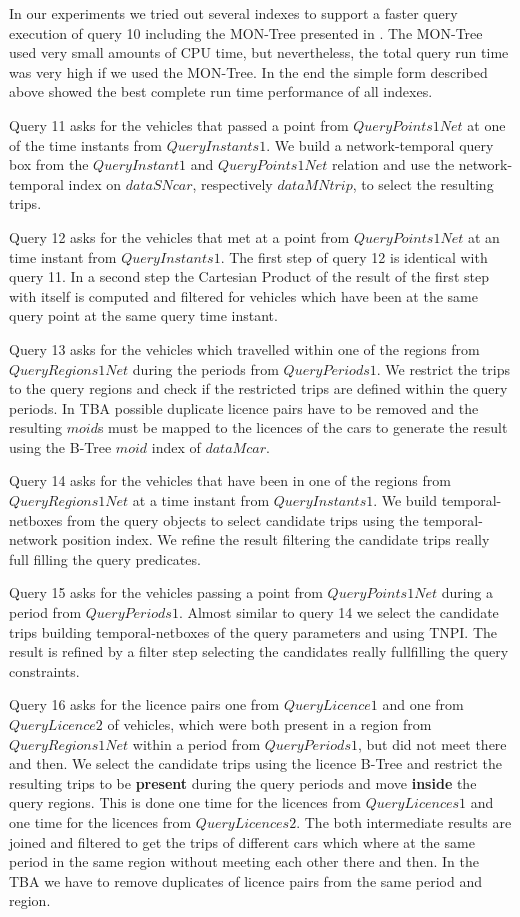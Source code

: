 \documentclass[a4paper]{article}
\newcommand{\op}[1]{\textbf{#1}}
\begin{document}
In our experiments we tried out several indexes to support a faster query execution
of query 10 including the MON-Tree presented in \cite{MONTreeAlmeidaGeoinformatica}.
The MON-Tree used very small amounts of CPU time, but nevertheless, the total query
run time was very high if we used the MON-Tree. In the end the simple form described
above showed the best complete run time performance of all indexes.

Query 11 asks for the vehicles that passed a point from $QueryPoints1Net$ at one of the
time instants from $QueryInstants1$. We build a network-temporal query box from the
$QueryInstant1$ and $QueryPoints1Net$ relation and use the network-temporal index
on $dataSNcar$, respectively $dataMNtrip$, to select the resulting trips.

Query 12 asks for the vehicles that met at a point from $QueryPoints1Net$ at an time
instant from $QueryInstants1$. The first step of query 12 is identical with query 11.
In a second step the Cartesian Product of the result of the first step with itself
is computed and filtered for vehicles which have been at the same query point
at the same query time instant.

Query 13 asks for the vehicles which travelled within one of the regions from
$QueryRegions1Net$ during the periods from $QueryPeriods1$. We restrict the trips
to the query regions and check if the restricted trips are defined within the query
periods. In TBA possible duplicate licence pairs have to be removed and the
resulting $moid$s must be mapped to the licences of the cars to generate the result
using the B-Tree $moid$ index of $dataMcar$.

Query 14 asks for the vehicles that have been in one of the regions from
$QueryRegions1Net$ at a time instant from $QueryInstants1$. We build
temporal-netboxes from the query objects to select candidate trips using the
temporal-network position index. We refine the
result filtering the candidate trips really full filling the query predicates.

Query 15 asks for the vehicles passing a point from $QueryPoints1Net$ during a
period from $QueryPeriods1$. Almost similar to query 14 we select the candidate
trips building temporal-netboxes of the query parameters and using TNPI. The
result is refined by a filter step selecting the candidates really fullfilling
the query constraints.

Query 16 asks for the licence pairs one from $QueryLicence1$ and one from
$QueryLicence2$ of vehicles, which were both present in a region from
$QueryRegions1Net$ within a period from $QueryPeriods1$, but did not meet there
and then. We select the candidate trips using the licence B-Tree and restrict
the resulting trips to be \op{present} during the query periods and move
\op{inside} the query regions. This is done one time for the licences from $QueryLicences1$ and one time for the licences from $QueryLicences2$.
The both intermediate results are joined and filtered to get the
trips of different cars which where at the same period in the same region
without meeting each other there and then. In the TBA we have
to remove duplicates of licence pairs from the same period and region.
\end{document}
